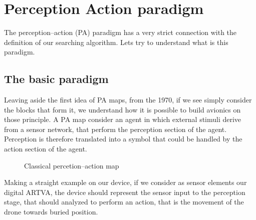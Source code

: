 \section{Perception Action paradigm}
The perception--action (PA) paradigm has a very strict connection with the definition of our searching algorithm. Lets try to understand what is this paradigm.

\subsection{The basic paradigm}
Leaving aside the first idea of PA maps, from the 1970, if we see simply consider the blocks that form it, we understand how it is possible to build avionics on those principle. A PA map consider an agent in which external stimuli derive from a sensor network, that perform the perception section of the agent. Perception is therefore translated into a symbol that could be handled by the action section of the agent.
\begin{figure}[h]
\caption{Classical percetion--action map}
\centering
{}
\end{figure}

Making a straight example on our device, if we consider as sensor elements our digital ARTVA, the device should represent the sensor input to the perception stage, that should analyzed to perform an action, that is the movement of the drone towards buried position.

